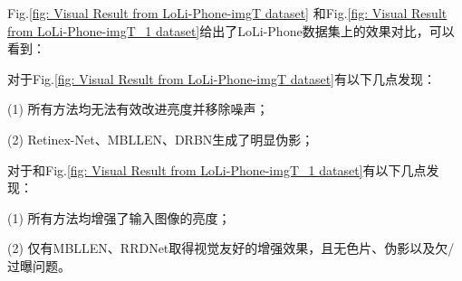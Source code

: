\documentclass[letterpaper,12pt]{article}
\begin{document}
	Fig.\ref{fig: Visual Result from LoLi-Phone-imgT dataset} 和Fig.\ref{fig: Visual Result from LoLi-Phone-imgT_1 dataset}给出了LoLi-Phone数据集上的效果对比，可以看到：
	
	对于Fig.\ref{fig: Visual Result from LoLi-Phone-imgT dataset}有以下几点发现：
	
	(1) 所有方法均无法有效改进亮度并移除噪声；
	
	(2) Retinex-Net、MBLLEN、DRBN生成了明显伪影；
	
	对于和Fig.\ref{fig: Visual Result from LoLi-Phone-imgT_1 dataset}有以下几点发现：
	
	(1) 所有方法均增强了输入图像的亮度；
	
	(2) 仅有MBLLEN、RRDNet取得视觉友好的增强效果，且无色片、伪影以及欠/过曝问题。
	
	
	\begin{table}[!htbp]
		\centering
		\tiny
\end{table}
\end{document}
